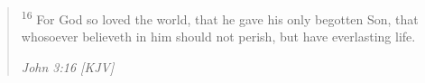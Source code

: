 \begin{quote}
\textsuperscript{16} For God so loved the world, that he gave his only begotten Son, that whosoever believeth in him should not perish, but have everlasting life.
\begin{flushright}
\emph{John 3:16 [KJV]}
\end{flushright}
\end{quote}